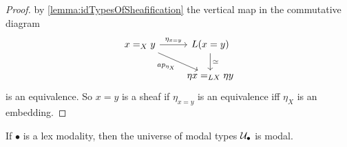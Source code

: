 \begin{proof}

	by \ref{lemma:idTypesOfSheafification} the vertical map in the commutative diagram
	\[\begin{tikzcd}
		{x =_X y} & {L(x=y)} \\
		& {\eta x =_{LX} \eta y}
		\arrow["{\eta_{x=y}}", from=1-1, to=1-2]
		\arrow["{ap_{\eta_X}}"', from=1-1, to=2-2]
		\arrow["\simeq", from=1-2, to=2-2]
	\end{tikzcd}\]
is an equivalence.
	So $x = y$ is a sheaf if $\eta_{x=y}$ is an equivalence iff $\eta_X$ is an embedding.
\end{proof}
\begin{lemma}{\label{lemma:SheavesHaveDescent}}
	If $\bullet$ is a lex modality, then the universe of modal types $\mathcal{U}_\bullet$ is modal.
\end{lemma}